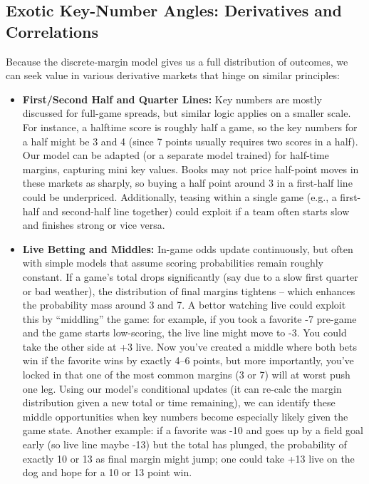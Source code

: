 \documentclass[11pt]{amsart}
\begin{document}
\subsection{Exotic Key-Number Angles: Derivatives and Correlations}
Because the discrete-margin model gives us a full distribution of outcomes, we can seek value in various derivative markets that hinge on similar principles:
\begin{itemize}
    \item \textbf{First/Second Half and Quarter Lines:} Key numbers are mostly discussed for full-game spreads, but similar logic applies on a smaller scale. For instance, a halftime score is roughly half a game, so the key numbers for a half might be 3 and 4 (since 7 points usually requires two scores in a half). Our model can be adapted (or a separate model trained) for half-time margins, capturing mini key values. Books may not price half-point moves in these markets as sharply, so buying a half point around 3 in a first-half line could be underpriced. Additionally, teasing within a single game (e.g., a first-half and second-half line together) could exploit if a team often starts slow and finishes strong or vice versa.
    \item \textbf{Live Betting and Middles:} In-game odds update continuously, but often with simple models that assume scoring probabilities remain roughly constant. If a game’s total drops significantly (say due to a slow first quarter or bad weather), the distribution of final margins tightens – which enhances the probability mass around 3 and 7. A bettor watching live could exploit this by “middling” the game: for example, if you took a favorite -7 pre-game and the game starts low-scoring, the live line might move to -3. You could take the other side at +3 live. Now you’ve created a middle where both bets win if the favorite wins by exactly 4–6 points, but more importantly, you’ve locked in that one of the most common margins (3 or 7) will at worst push one leg. Using our model’s conditional updates (it can re-calc the margin distribution given a new total or time remaining), we can identify these middle opportunities when key numbers become especially likely given the game state. Another example: if a favorite was -10 and goes up by a field goal early (so live line maybe -13) but the total has plunged, the probability of exactly 10 or 13 as final margin might jump; one could take +13 live on the dog and hope for a 10 or 13 point win.

\end{itemize}
\end{document}
